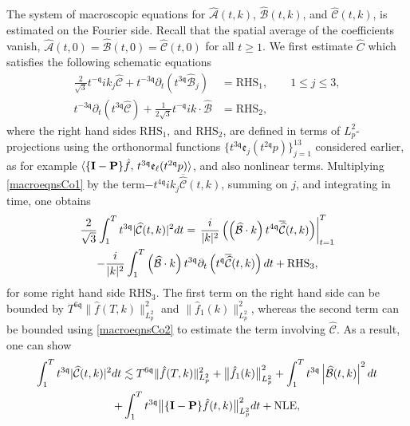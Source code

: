 \documentclass[reqno]{amsart}
\newcommand{\pv}{p}
\def\norm#1{\big\Vert#1\big\Vert}
\newcommand{\qq}{\mathfrak{q}}
\newcommand{\tq}{t^{\qq}}
\newcommand{\tmq}{t^{-\qq}}
\newcommand{\tqq}{t^{2\qq}}
\newcommand{\tTq}{t^{3\qq}}
\newcommand{\tmTq}{t^{-3\qq}}
\newcommand{\micro}{{\bf \{I- P\}}}
\theoremstyle{definition}
\numberwithin{equation}{section}
\numberwithin{theorem}{section}
\begin{document}
The system of macroscopic equations for \(\widehat{\mathcal{A}}(t,k)\), \(\widehat{\mathcal{B}}(t,k)\), and \(\widehat{\mathcal{C}}(t,k)\), is estimated on the Fourier side. Recall that the spatial average of the coefficients vanish, \(\widehat{\mathcal{A}}(t,0)=\widehat{\mathcal{B}}(t,0)=\widehat{\mathcal{C}}(t,0)\) for all \(t\geq 1\). We first estimate \(\widehat{C}\) which satisfies the following schematic equations
\begin{align}\label{macroeqnsCo1}
    \frac{2}{\sqrt{3}}\tmq ik_j  \widehat{\mathcal{C}}+ \tmTq\partial_t \left(\tTq \widehat{\mathcal{B}}_j \right)  &=
\mathrm{RHS}_1,\qquad 1\leq j\leq 3,\\
 \tmTq\partial_t \left(\tTq \widehat{\mathcal{C}} \right)
  +
\frac{1}{2\sqrt{3}}  \tmq  ik \cdot \widehat{\mathcal{B}}
&=\mathrm{RHS}_2, \label{macroeqnsCo2}
\end{align}
where the right hand sides \(\mathrm{RHS}_1\), and \(\mathrm{RHS}_2\), are defined in terms of \(L^2_p\)-projections using the orthonormal functions \(\{t^{3\mathfrak{q}}\mathfrak{e}_{j}(t^{2\mathfrak{q}}p)\}_{j=1}^{13}\) considered earlier, as for example \(  \langle  \micro \hat{f},\,\tTq \mathfrak{e}_{\ell}(\tqq \pv)\rangle\), and also nonlinear terms. Multiplying \eqref{macroeqnsCo1} by  the term$-t^{4\qq} ik_j  \overline{\widehat{\mathcal{C}}}(t,k)$, summing on \(j\), and integrating in time, one obtains
\begin{multline}\notag 
 \frac{2}{\sqrt{3}}\int_1^{T} \tTq|\widehat{\mathcal{C}}(t,k)|^2  dt
=
\left. \frac{i}{|k|^2} \left( \left( \widehat{\mathcal{B}}\cdot k  \right)t^{4\qq}\overline{\widehat{\mathcal{C}}}(t,k) \right)\right|_{t=1}^T \\
-
\frac{i}{|k|^2} \int_1^{T} \left( \widehat{\mathcal{B}}\cdot k  \right) \tTq\partial_t  \left(\tq\overline{\widehat{\mathcal{C}}}(t,k)\right) dt+\mathrm{RHS_3},
\end{multline}
for some right hand side \(\mathrm{RHS_3}\). 
The first term on the right hand side can be bounded by \(T^{6\qq} \| \hat{f}(T,k)\|_{L^2_{\pv}}^2\) and \(\| \hat{f}_1(k)\|_{L^2_{\pv}}^2\), whereas the second term can be bounded using \eqref{macroeqnsCo2} to estimate the term involving \( \widehat{\mathcal{C}}\). As a result, one can show 
\begin{multline}\label{FT.C.estimate0}
\int_1^{T} \tTq|\widehat{\mathcal{C}}(t,k)|^2  dt
\lesssim
 T^{6\qq}\Vert \hat{f}(T,k)\Vert_{L^2_{\pv}}^2+\norm{ \hat{f}_1(k)}_{L^2_{\pv}}^2
  +
\int^{T}_{1} \tTq \left|\widehat{{\mathcal{B}}}(t,k)\right|^2 dt  \\
+\int_1^{T} \tTq\norm{\micro \hat{f}(t,k)}_{L^2_{\pv}}^2dt
+\mathrm{NLE},
\end{multline}
\end{document}

